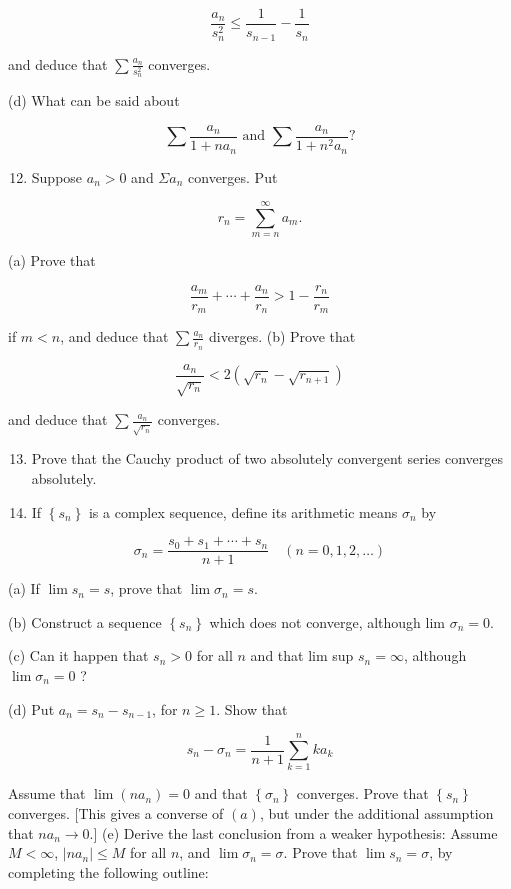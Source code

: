 \documentclass[10pt]{article}
\begin{document}
$$
\frac{a_{n}}{s_{n}^{2}} \leq \frac{1}{s_{n-1}}-\frac{1}{s_{n}}
$$

and deduce that $\sum \frac{a_{n}}{s_{n}^{2}}$ converges.

(d) What can be said about

$$
\sum \frac{a_{n}}{1+n a_{n}} \text { and } \sum \frac{a_{n}}{1+n^{2} a_{n}} ?
$$

\begin{enumerate}
  \setcounter{enumi}{11}
  \item Suppose $a_{n}>0$ and $\Sigma a_{n}$ converges. Put
\end{enumerate}

$$
r_{n}=\sum_{m=n}^{\infty} a_{m} .
$$

(a) Prove that

$$
\frac{a_{m}}{r_{m}}+\cdots+\frac{a_{n}}{r_{n}}>1-\frac{r_{n}}{r_{m}}
$$

if $m<n$, and deduce that $\sum \frac{a_{n}}{r_{n}}$ diverges. (b) Prove that

$$
\frac{a_{n}}{\sqrt{r_{n}}}<2\left(\sqrt{r_{n}}-\sqrt{r_{n+1}}\right)
$$

and deduce that $\sum \frac{a_{n}}{\sqrt{r_{n}}}$ converges.

\begin{enumerate}
  \setcounter{enumi}{12}
  \item Prove that the Cauchy product of two absolutely convergent series converges absolutely.

  \item If $\left\{s_{n}\right\}$ is a complex sequence, define its arithmetic means $\sigma_{n}$ by

\end{enumerate}

$$
\sigma_{n}=\frac{s_{0}+s_{1}+\cdots+s_{n}}{n+1} \quad(n=0,1,2, \ldots)
$$

(a) If $\lim s_{n}=s$, prove that $\lim \sigma_{n}=s$.

(b) Construct a sequence $\left\{s_{n}\right\}$ which does not converge, although lim $\sigma_{n}=0$.

(c) Can it happen that $s_{n}>0$ for all $n$ and that lim sup $s_{n}=\infty$, although $\lim \sigma_{n}=0$ ?

(d) Put $a_{n}=s_{n}-s_{n-1}$, for $n \geq 1$. Show that

$$
s_{n}-\sigma_{n}=\frac{1}{n+1} \sum_{k=1}^{n} k a_{k}
$$

Assume that $\lim \left(n a_{n}\right)=0$ and that $\left\{\sigma_{n}\right\}$ converges. Prove that $\left\{s_{n}\right\}$ converges. [This gives a converse of $(a)$, but under the additional assumption that $n a_{n} \rightarrow 0$.] (e) Derive the last conclusion from a weaker hypothesis: Assume $M<\infty$, $\left|n a_{n}\right| \leq M$ for all $n$, and $\lim \sigma_{n}=\sigma$. Prove that $\lim s_{n}=\sigma$, by completing the following outline:
\end{document}
